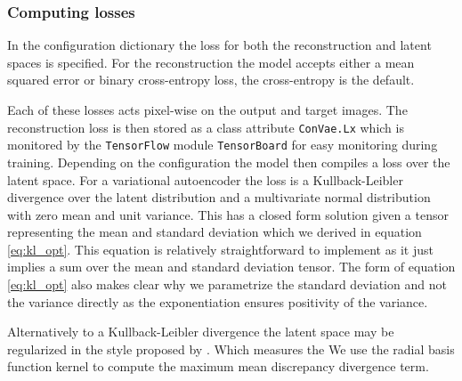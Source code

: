 \subsubsection{Computing losses}

In the configuration dictionary the loss for both the reconstruction and latent spaces is specified. For the reconstruction the model accepts either a mean squared error or binary cross-entropy loss, the cross-entropy is the default. 

Each of these losses acts pixel-wise on the output and target images. The reconstruction loss is then stored as a class attribute \lstinline{ConVae.Lx} which is monitored by the \lstinline{TensorFlow} module \lstinline{TensorBoard} for easy monitoring during training. Depending on the configuration the model then compiles a loss over the latent space. For a variational autoencoder the loss is a Kullback-Leibler divergence over the latent distribution and a multivariate normal distribution with zero mean and unit variance. This has a closed form solution given a tensor representing the mean and standard deviation which we derived in equation \ref{eq:kl_opt}. This equation is relatively straightforward to implement as it just implies a sum over the mean and standard deviation tensor. The form of equation \ref{eq:kl_opt} also makes clear why we parametrize the standard deviation and not the variance directly as the exponentiation ensures positivity of the variance. 

Alternatively to a Kullback-Leibler divergence the latent space may be regularized in the style proposed by \citet{Zhao}. Which measures the  We use the radial basis function kernel to compute the maximum mean discrepancy divergence term. 


